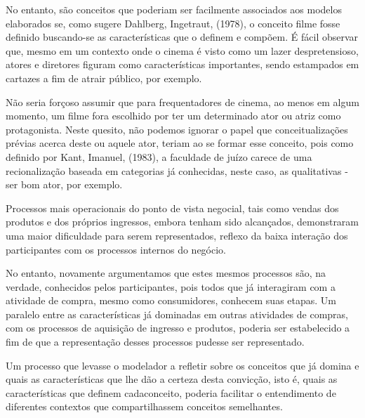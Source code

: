 No entanto, são conceitos que poderiam ser facilmente associados aos modelos elaborados se, como sugere Dahlberg, Ingetraut, (1978), o conceito filme fosse definido buscando-se as características que o definem e compõem. É fácil observar que, mesmo em um contexto onde o cinema é visto como um lazer despretensioso, atores e diretores figuram como características importantes, sendo estampados em cartazes a fim de atrair público, por exemplo.

Não seria forçoso assumir que para frequentadores de cinema, ao menos em algum momento, um filme fora escolhido por ter um determinado ator ou atriz como protagonista. Neste quesito, não podemos ignorar o papel que conceitualizações prévias acerca deste ou aquele ator, teriam ao se formar esse conceito, pois como definido por Kant, Imanuel, (1983), a faculdade de juízo carece de uma recionalização baseada em categorias já conhecidas, neste caso, as qualitativas - ser bom ator, por exemplo.

Processos mais operacionais do ponto de vista negocial, tais como vendas dos produtos e dos próprios ingressos, embora tenham sido alcançados, demonstraram uma maior dificuldade para serem representados, reflexo da baixa interação dos participantes com os processos internos do negócio.

No entanto, novamente argumentamos que estes mesmos processos são, na verdade, conhecidos pelos participantes, pois todos que já interagiram com a atividade de compra, mesmo como consumidores, conhecem suas etapas. Um paralelo entre as características já dominadas em outras atividades de compras, com os processos de aquisição de ingresso e produtos, poderia ser estabelecido a fim de que a representação desses processos pudesse ser representado.

Um processo que levasse o modelador a refletir sobre os conceitos que já domina e quais as características que lhe dão a certeza desta convicção, isto é, quais as características que definem cadaconceito, poderia facilitar o entendimento de diferentes contextos que compartilhassem conceitos semelhantes. 